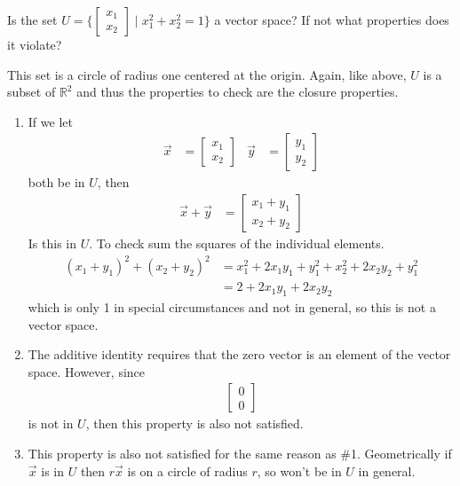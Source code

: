 \begin{example}
Is the set $\displaystyle U=\{ \begin{bmatrix}
x_1 \\ x_2 
\end{bmatrix} \; | \; x_1^2+x_2^2=1\}$ a vector space?  If not what properties does it violate?  

\solution

This set is a circle of radius one centered at the origin.  Again, like above, $U$ is a subset of $\mathbb{R}^2$ and thus the properties to check are the closure properties.  

\begin{enumerate}
\item If we let 
%
\begin{align*}
\vec{x} &= \begin{bmatrix}
x_1 \\ x_2 
\end{bmatrix}& \vec{y} & = \begin{bmatrix}
y_1 \\ y_2 
\end{bmatrix}
\end{align*}
both be in $U$, then 
%
\begin{align*}
\vec{x}+\vec{y} & = \begin{bmatrix}
x_1 + y_1 \\ x_2 +y_2 
\end{bmatrix}
\end{align*}
Is this in $U$.  To check sum the squares of the individual elements. 
%
\begin{align*}
(x_1+y_1)^2 + (x_2+y_2)^2 & = x_1^2+ 2x_1y_1 + y_1^2+x_2^2+ 2x_2y_2 + y_1^2 \\
& = 2 + 2x_1y_1 + 2 x_2 y_2 
\end{align*}
which is only 1 in special circumstances and not in general, so this is not a vector space. 

\setcounter{enumi}{3}
\item The additive identity requires that the zero vector is an element of the vector space.  However, since
%
\begin{align*}
\begin{bmatrix}
0 \\ 0
\end{bmatrix} 
\end{align*}
is not in $U$, then this property is also not satisfied. 

\setcounter{enumi}{5}
\item This property is also not satisfied for the same reason as \#1.  Geometrically if $\vec{x}$ is in $U$ then $r\vec{x}$ is on a circle of radius $r$, so won't be in $U$ in general.  
\end{enumerate}

\end{example}



